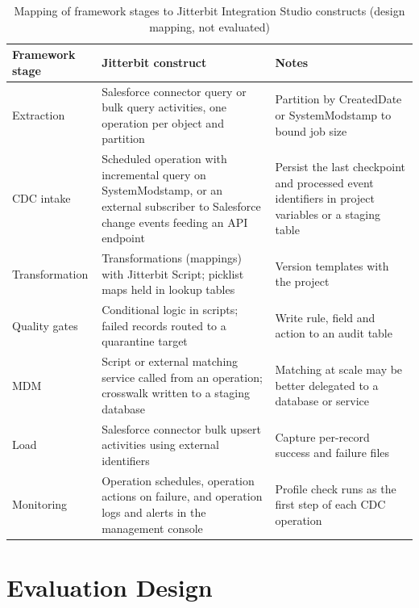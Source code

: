\begin{table}[!t]
\centering
\caption{Mapping of framework stages to Jitterbit Integration Studio constructs (design mapping, not evaluated)}
\label{tab:2}
\setlength{\tabcolsep}{4pt}
\renewcommand{\arraystretch}{1.15}
\footnotesize
\begin{tabular}{>{\raggedright\arraybackslash\hspace{0pt}}p{}>{\raggedright\arraybackslash\hspace{0pt}}p{}>{\raggedright\arraybackslash\hspace{0pt}}p{}}
\hline
\textbf{Framework stage} & \textbf{Jitterbit construct} & \textbf{Notes} \\
\hline
Extraction & Salesforce connector query or bulk query activities, one operation per object and partition & Partition by CreatedDate or SystemModstamp to bound job size \\
CDC intake & Scheduled operation with incremental query on SystemModstamp, or an external subscriber to Salesforce change events feeding an API endpoint & Persist the last checkpoint and processed event identifiers in project variables or a staging table \\
Transformation & Transformations (mappings) with Jitterbit Script; picklist maps held in lookup tables & Version templates with the project \\
Quality gates & Conditional logic in scripts; failed records routed to a quarantine target & Write rule, field and action to an audit table \\
MDM & Script or external matching service called from an operation; crosswalk written to a staging database & Matching at scale may be better delegated to a database or service \\
Load & Salesforce connector bulk upsert activities using external identifiers & Capture per-record success and failure files \\
Monitoring & Operation schedules, operation actions on failure, and operation logs and alerts in the management console & Profile check runs as the first step of each CDC operation \\
\hline
\end{tabular}
\end{table}


\section{Evaluation Design}\label{sec:4}

